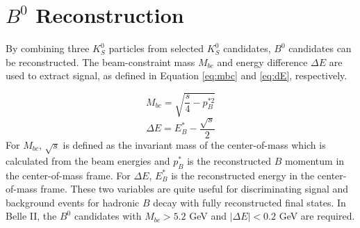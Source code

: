  
 
 


\section{$B^0$  Reconstruction}
By combining three $K_S^0$ particles from selected $K_S^0$ candidates, $B^0$ candidates can be reconstructed. The beam-constraint mass $M_{bc}$ and energy difference $\Delta E$ are used to extract signal, as defined in Equation \ref{eq:mbc} and \ref{eq:dE}, respectively. 

\begin{equation}\label{eq:mbc}
M_{bc} = \sqrt{\frac{s}{4}-p^{*2}_B} 
\end{equation}
\begin{equation}\label{eq:dE}
\Delta E = E^*_B - \frac{\sqrt{s}}{2}
\end{equation}
For $M_{bc}$, $\sqrt{s}$ is defined as the invariant mass of the center-of-mass which is calculated from the beam energies and $p^*_B$ is the reconstructed $B$ momentum in the center-of-mass frame. For $\Delta E$, $E^*_B$ is the reconstructed energy in the center-of-mass frame. These two variables are quite useful for discriminating signal and background events for hadronic $B$ decay with fully reconstructed final states. In Belle II, the $B^0$ candidates with $M_{bc} > 5.2$ GeV and $|\Delta{E}| < 0.2$ GeV are required. 


